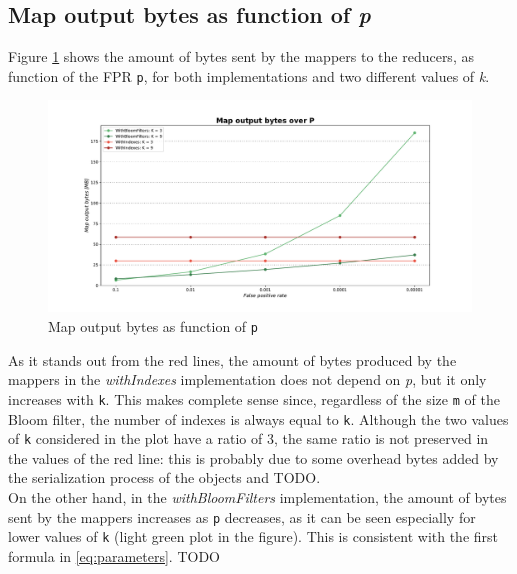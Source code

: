 \subsection*{Map output bytes as function of \textit{p}}

Figure \ref{fig:MapOutputBytesP} shows the amount of bytes sent by the mappers to the reducers, as function of the FPR \texttt{p}, for both implementations and two different values of \textit{k}.\\

\begin{figure}[H]
    \begin{center}
        \includegraphics[scale=.45,trim={3cm 0 3cm 0},clip]{img/MapOutputBytesP.pdf}
    \end{center}
    \vspace*{-0.5cm}
    \caption{Map output bytes as function of \texttt{p}}
    \label{fig:MapOutputBytesP}
\end{figure}

As it stands out from the red lines, the amount of bytes produced by the mappers in the \textit{withIndexes} implementation does not depend on \textit{p}, but it only increases with \texttt{k}. This makes complete sense since, regardless of the size \texttt{m} of the Bloom filter, the number of indexes is always equal to \texttt{k}. Although the two values of \texttt{k} considered in the plot have a ratio of 3, the same ratio is not preserved in the values of the red line: this is probably due to some overhead bytes added by the serialization process of the objects and TODO.\\
On the other hand, in the \textit{withBloomFilters} implementation, the amount of bytes sent by the mappers increases as \texttt{p} decreases, as it can be seen especially for lower values of \texttt{k} (light green plot in the figure). This is consistent with the first formula in \ref{eq:parameters}. TODO

